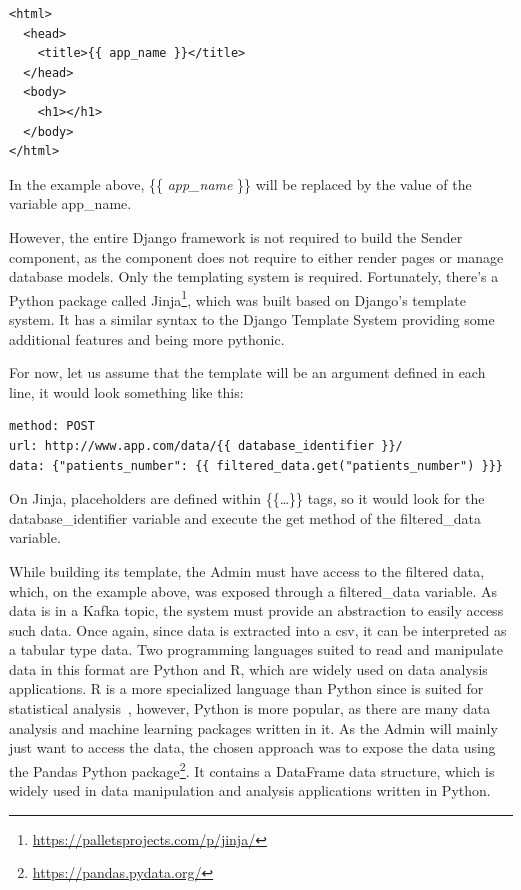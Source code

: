 \begin{verbatim}
<html>
  <head>
    <title>{{ app_name }}</title>
  </head>
  <body>
    <h1></h1>
  </body>
</html>
\end{verbatim}
In the example above, \{\{ \textit{app\_name} \}\} will be replaced by the value of the variable app\_name.

However, the entire Django framework is not required to build the Sender component, as the component does not require to either render pages or manage database models.
Only the templating system is required.
Fortunately, there's a Python package called Jinja\footnote{\url{https://palletsprojects.com/p/jinja/}}, which was built based on Django's template system.
It has a similar syntax to the Django Template System providing some additional features and being more pythonic.

For now, let us assume that the template will be an argument defined in each line, it would look something like this:
\begin{verbatim}
method: POST
url: http://www.app.com/data/{{ database_identifier }}/
data: {"patients_number": {{ filtered_data.get("patients_number") }}}
\end{verbatim}
On Jinja, placeholders are defined within \{\{\ldots\}\} tags, so it would look for the database\_identifier variable and execute the get method of the filtered\_data variable.

While building its template, the Admin must have access to the filtered data, which, on the example above, was exposed through a filtered\_data variable.
As data is in a Kafka topic, the system must provide an abstraction to easily access such data.
Once again, since data is extracted into a \gls{csv}, it can be interpreted as a tabular type data.
Two programming languages suited to read and manipulate data in this format are Python and R, which are widely used on data analysis applications.
R is a more specialized language than Python since is suited for statistical analysis~\cite{r-lang}, however, Python is more popular, as there are many data analysis and machine learning packages written in it.
As the Admin will mainly just want to access the data, the chosen approach was to expose the data using the Pandas Python package\footnote{\url{https://pandas.pydata.org/}}.
It contains a DataFrame data structure, which is widely used in data manipulation and analysis applications written in Python.

